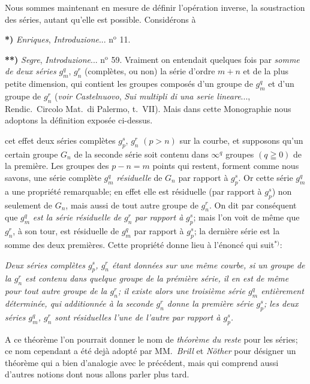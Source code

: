 \documentclass{article}
\begin{document}
Nous sommes maintenant en mesure de définir l'opération inverse, la soustraction des séries, autant qu'elle est possible. Considérons à

\textbf{*)} \emph{Enriques}, \emph{Introduzione}... n${}^{\text{o}}$ 11.

\textbf{**)} \emph{Segre}, \emph{Introduzione}... n${}^{\text{o}}$ 59. Vraiment on entendait quelques fois par \emph{somme de deux séries} $g_{m}^{q}$, $g_{n}^{r}$ (complètes, ou non) la série d'ordre $m + n$ et de la plus petite dimension, qui contient les groupes composés d'un groupe de $g_{m}^{q}$ et d'un groupe de $g_{n}^{r}$ (\emph{voir} \emph{Castelnuovo}, \emph{Sui multipli di una serie lineare}..., Rendic.\ Circolo Mat.\ di Palermo, t.\ VII). Mais dans cette Monographie nous adoptons la définition exposée ci-dessus.

cet effet deux séries complètes $g_{p}^{s}$, $g_{n}^{r}$ $(p > n)$ sur la courbe, et supposons qu'un certain groupe $G_{n}$ de la seconde série soit contenu dans $\infty^{q}$ groupes $(q \geqq 0)$ de la première. Les groupes des $p - n = m$ points qui restent, forment comme nous savons, une série complète $g_{m}^{q}$ \emph{résiduelle} de $G_{n}$ par rapport à $g_{p}^{s}$. Or cette série $g_{m}^{q}$ a une propriété remarquable; en effet elle est résiduelle (par rapport à $g_{p}^{s}$) non seulement de $G_{n}$, mais aussi de tout autre groupe de $g_{n}^{r}$. On dit par conséquent que $g_{m}^{q}$ \emph{est la série résiduelle de} $g_{n}^{r}$ \emph{par rapport à} $g_{p}^{s}$; mais l'on voit de même que $g_{n}^{r}$, à son tour, est résiduelle de $g_{m}^{q}$ par rapport à $g_{p}^{s}$; la dernière série est la somme des deux premières. Cette propriété donne lieu à l'énoncé qui suit${}^{*)}$:

\emph{Deux séries complètes $g_{p}^{s}$, $g_{n}^{r}$ étant données sur une même courbe, si un groupe de la $g_{n}^{r}$ est contenu dans quelque groupe de la prémière série, il en est de même pour tout autre groupe de la $g_{n}^{r}$; il existe alors une troisième série $g_{m}^{q}$ entièrement déterminée, qui additionnée à la seconde $g_{n}^{r}$ donne la première série $g_{p}^{s}$; les deux séries $g_{m}^{q}$, $g_{n}^{r}$ sont résiduelles l'une de l'autre par rapport à $g_{p}^{s}$.}

A ce théorème l'on pourrait donner le nom de \emph{théorème du reste} pour les séries; ce nom cependant a été dejà adopté par MM.\ \emph{Brill} et \emph{Nöther} pour désigner un théorème qui a bien d'analogie avec le précédent, mais qui comprend aussi d'autres notions dont nous allons parler plus tard.
\end{document}
